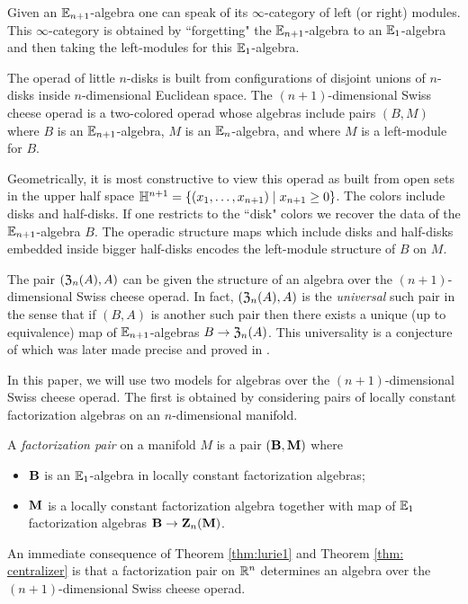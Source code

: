 \documentclass[11pt]{amsart}
\numberwithin{equation}{section}
\begin{document}
Given an $\mathbb E_{n+1}$-algebra one can speak of its $\infty$-category of left (or right) modules.
This $\infty$-category is obtained by ``forgetting" the $\mathbb E_{n+1}$-algebra to an $\mathbb E_1$-algebra and then taking the left-modules for this $\mathbb E_1$-algebra.

The operad of little $n$-disks is built from configurations of disjoint unions of $n$-disks inside $n$-dimensional Euclidean space.
The $(n+1)$-dimensional Swiss cheese operad is a two-colored operad whose algebras include pairs $(B, M)$ where $B$ is an $\mathbb E_{n+1}$-algebra, $M$ is an $\mathbb E_n$-algebra, and where $M$ is a left-module for $B$.

Geometrically, it is most constructive to view this operad as built from open sets in the upper half space $\mathbb H^{n+1} = \{(x_1,\ldots, x_{n+1}) \; | \; x_{n+1} \geq 0\}$.
The colors include disks and half-disks. 
If one restricts to the ``disk" colors we recover the data of the $\mathbb E_{n+1}$-algebra $B$. 
The operadic structure maps which include disks and half-disks embedded inside bigger half-disks encodes the left-module structure of $B$ on $M$.

The pair $(\mathfrak Z_{n} (A), A)$ can be given the structure of an algebra over the $(n+1)$-dimensional Swiss cheese operad. 
In fact, $(\mathfrak Z_{n} (A), A)$ is the {\em universal} such pair in the sense that if $(B, A)$ is another such pair then there exists a unique (up to equivalence) map of $\mathbb E_{n+1}$-algebras $B \to \mathfrak Z_n(A)$. 
This universality is a conjecture of \cite{Kontsevich} which was later made precise and proved in \cite{Thomas, Tamarkin, Dolgushev, jnkf others?}. 

In this paper, we will use two models for algebras over the $(n+1)$-dimensional Swiss cheese operad. 
The first is obtained by considering pairs of locally constant factorization algebras on an $n$-dimensional manifold. 

\begin{dfn}\label{dfn:pair}
A {\em factorization pair} on a manifold $M$ is a pair $(\mathbf B, \mathbf M)$ where
\begin{itemize}
\item $\mathbf B$ is an $\mathbb E_1$-algebra in locally constant factorization algebras;
\item $\mathbf M$ is a locally constant factorization algebra together with map of $\mathbb E_1$ factorization algebras $\mathbf B \to \mathbf Z_n(\mathbf M)$.
\end{itemize}
\end{dfn}

An immediate consequence of Theorem \ref{thm:lurie1} and Theorem \ref{thm: centralizer} is that a factorization pair on $\mathbb R^n$ determines an algebra over the $(n+1)$-dimensional Swiss cheese operad. 
\end{document}
